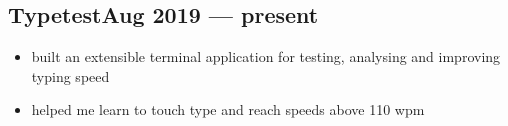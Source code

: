 \documentclass{article}
\begin{document}


\subsection{Typetest\hfill Aug 2019 --- present}
\begin{itemize}
  \itemsep0em
  \item built an extensible terminal application for testing, analysing and improving typing speed
  \item helped me learn to touch type and reach speeds above 110 wpm
\end{itemize}

\end{document}
